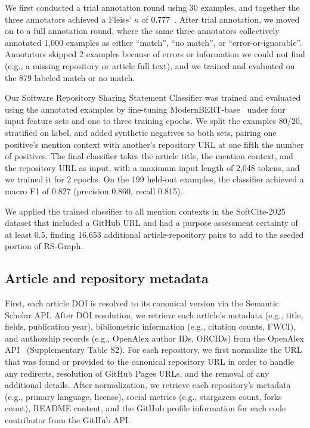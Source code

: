 \documentclass[pdflatex,sn-nature]{sn-jnl}%
\begin{document}
We first conducted a trial annotation round using 30 examples, and together the three annotators achieved a Fleiss' $\kappa$ of 0.777~\cite{fleiss1971measuring}.
After trial annotation, we moved on to a full annotation round, where the same three annotators collectively annotated 1,000 examples as either ``match'', ``no match'', or ``error-or-ignorable''.
Annotators skipped 2 examples because of errors or information we could not find (e.g., a missing repository or article full text), and we trained and evaluated on the 879 labeled match or no match.

Our Software Repository Sharing Statement Classifier was trained and evaluated using the annotated examples by fine-tuning ModernBERT-base~\cite{warner2025smarter} under four input feature sets and one to three training epochs.
We split the examples 80/20, stratified on label, and added synthetic negatives to both sets, pairing one positive's mention context with another's repository URL at one fifth the number of positives.
The final classifier takes the article title, the mention context, and the repository URL as input, with a maximum input length of 2,048 tokens, and we trained it for 2 epochs.
On the 199 held-out examples, the classifier achieved a macro F1 of 0.827 (precision 0.860, recall 0.815).

We applied the trained classifier to all mention contexts in the SoftCite-2025 dataset that included a GitHub URL and had a purpose assessment certainty of at least 0.5, finding 16,653 additional article-repository pairs to add to the seeded portion of RS-Graph.

\subsection{Article and repository metadata}\label{subsec:m-metadata}

First, each article DOI is resolved to its canonical version via the Semantic Scholar API.
After DOI resolution, we retrieve each article's metadata (e.g., title, fields, publication year), bibliometric information (e.g., citation counts, FWCI), and authorship records (e.g., OpenAlex author IDs, ORCIDs) from the OpenAlex API~\cite{priem2022openalex} (Supplementary Table S2).
For each repository, we first normalize the URL that was found or provided to the canonical repository URL in order to handle any redirects, resolution of GitHub Pages URLs, and the removal of any additional details.
After normalization, we retrieve each repository's metadata (e.g., primary language, license), social metrics (e.g., stargazers count, forks count), README content, and the GitHub profile information for each code contributor from the GitHub API.
\end{document}
